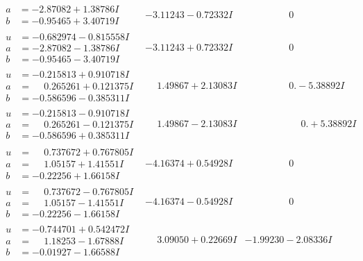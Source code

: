 \documentclass[1p]{elsarticle_modified}
\theoremstyle{definition}
\begin{document}
$$\begin{array}{c|c|c}
\begin{aligned}
a &= -2.87082 + 1.38786 I \\
b &= -0.95465 + 3.40719 I\end{aligned}
 & -3.11243 - 0.72332 I & \phantom{-0.000000 } 0 \\ \hline\begin{aligned}
u &= -0.682974 - 0.815558 I \\
a &= -2.87082 - 1.38786 I \\
b &= -0.95465 - 3.40719 I\end{aligned}
 & -3.11243 + 0.72332 I & \phantom{-0.000000 } 0 \\ \hline\begin{aligned}
u &= -0.215813 + 0.910718 I \\
a &= \phantom{-}0.265261 + 0.121375 I \\
b &= -0.586596 - 0.385311 I\end{aligned}
 & \phantom{-}1.49867 + 2.13083 I & \phantom{-0.000000 } 0. - 5.38892 I \\ \hline\begin{aligned}
u &= -0.215813 - 0.910718 I \\
a &= \phantom{-}0.265261 - 0.121375 I \\
b &= -0.586596 + 0.385311 I\end{aligned}
 & \phantom{-}1.49867 - 2.13083 I & \phantom{-0.000000 -}0. + 5.38892 I \\ \hline\begin{aligned}
u &= \phantom{-}0.737672 + 0.767805 I \\
a &= \phantom{-}1.05157 + 1.41551 I \\
b &= -0.22256 + 1.66158 I\end{aligned}
 & -4.16374 + 0.54928 I & \phantom{-0.000000 } 0 \\ \hline\begin{aligned}
u &= \phantom{-}0.737672 - 0.767805 I \\
a &= \phantom{-}1.05157 - 1.41551 I \\
b &= -0.22256 - 1.66158 I\end{aligned}
 & -4.16374 - 0.54928 I & \phantom{-0.000000 } 0 \\ \hline\begin{aligned}
u &= -0.744701 + 0.542472 I \\
a &= \phantom{-}1.18253 - 1.67888 I \\
b &= -0.01927 - 1.66588 I\end{aligned}
 & \phantom{-}3.09050 + 0.22669 I & -1.99230 - 2.08336 I \\ \hline\begin{aligned}

\end{aligned}
\end{array}$$
\end{document}
